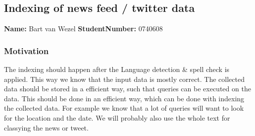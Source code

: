 \subsection{Indexing of news feed / twitter data   }
\textbf{Name:} Bart van Wezel  \textbf{StudentNumber:} 0740608

\subsubsection*{Motivation}
The indexing should happen after the Language detection \& spell check is applied. This way we know that the input data is mostly correct.  The collected data should be stored in a efficient way, such that queries can be executed on the data. This should be done in an efficient way, which can be done with indexing the collected data. 
For example we know that a lot of queries will want to look for the location and the date. 
We will probably also use the whole text for classying the news or tweet. 

